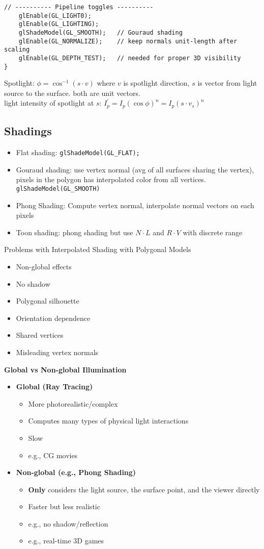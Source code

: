 \documentclass[8pt,twocolumn]{extarticle}
\begin{document}
\begin{lstlisting}[mathescape=true]
    // ---------- Pipeline toggles ----------
    glEnable(GL_LIGHT0);
    glEnable(GL_LIGHTING);
    glShadeModel(GL_SMOOTH);   // Gouraud shading
    glEnable(GL_NORMALIZE);    // keep normals unit-length after scaling
    glEnable(GL_DEPTH_TEST);   // needed for proper 3D visibility
}  
\end{lstlisting}
Spotlight: $\phi = \cos^{-1}(s \cdot v)$ where $v$ is spotlight direction, $s$ is vector from light source to the surface. both are unit vectors.\\
light intensity of spotlight at $s$: $I_p^{'} = I_p(\cos \phi)^n = I_p(s\cdot v_s)^n$
\subsection*{Shadings}
\begin{itemize}
  \item Flat shading: \texttt{glShadeModel(GL\_FLAT);}
  \item Gouraud shading: use vertex normal (avg of all surfaces sharing the vertex), pixels in the polygon has interpolated color from all vertices. \texttt{glShadeModel(GL\_SMOOTH)}
  \item Phong Shading: Compute vertex normal, interpolate normal vectors on each pixels
  \item Toon shading: phong shading but use $N\cdot L$ and $R\cdot V$ with discrete range 
\end{itemize}
Problems with Interpolated Shading with Polygonal Models
\begin{itemize}
  \item Non-global effects
  \item No shadow
  \item Polygonal silhouette
  \item Orientation dependence
  \item Shared vertices
  \item Misleading vertex normals
\end{itemize}
\textbf{Global vs Non-global Illumination}
\begin{itemize}
  \item \textbf{Global (Ray Tracing)}
  \begin{itemize}
    \item More photorealistic/complex
    \item Computes many types of physical light interactions
    \item Slow
    \item e.g., CG movies
  \end{itemize}
  \item \textbf{Non-global (e.g., Phong Shading)}
  \begin{itemize}
    \item \textbf{Only} considers the light source, the surface point, and the viewer directly
    \item Faster but less realistic
    \item e.g., no shadow/reflection
    \item e.g., real-time 3D games
  \end{itemize}
\end{itemize}
\end{document}
